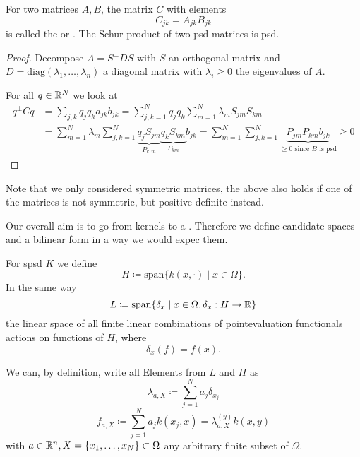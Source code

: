 \begin{lemma}\label{lemma:1.6}
    For two matrices $A,B$, the matrix $C$ with elements 
    \[C_{jk}=A_{jk}B_{jk}\]
    is called the  or . The Schur product of two 
    psd matrices is psd.
\end{lemma}

\begin{proof}
    Decompose $A=S^\perp DS$ with $S$ an 
    orthogonal matrix and $D=\text{diag}(\lambda_1,\dots,\lambda_n)$ 
    a diagonal matrix with $\lambda_i\geq 0$ the eigenvalues of $A$.

    For all $q\in\mathbb{R}^N$ we look at 
    \begin{align*}
        q^\perp Cq&=\sum_{j,k}q_jq_ka_{jk}b_{jk}=\sum_{j,k=1}^N q_j q_k\sum_{m=1}^N\lambda_m S_{jm}S_{km}\\
        &=\sum_{m=1}^N \lambda_m \sum_{j,k=1}^N \underbrace{q_j S_{jm}}_{P_{k,m}} \underbrace{q_k S_{km}}_{P_{km}} b_{jk}=\sum_{m=1}^N\sum_{j,k=1}^N\underbrace{P_{jm}P_{km}b_{jk}}_{\geq 0\text{ since } B \text{ is psd}}\geq 0
    \end{align*}
\end{proof}

\begin{remark}
    Note that we only considered symmetric matrices, the above also holds if one of the matrices is not symmetric, but positive definite instead. %
\end{remark}

\begin{remark}
    Our overall aim is to go from kernels to a . Therefore 
    we define candidate spaces and a bilinear form in a way we would expec them.
\end{remark}

\begin{*definition}
    For spsd $K$ we define 
    \[H\coloneqq\text{span}\{k(x,\cdot)\mid x\in\Omega\}.\]
    In the same way
    \[L\coloneqq \text{span}\{\delta_x\mid x\in\Omega,\delta_x:H\to\mathbb{R}\}\]
    the linear space of all finite linear combinations of pointevaluation functionals actions on functions of $H$, where \[\delta_x(f)=f(x).\]
\end{*definition}

We can, by definition, write all Elements from $L$ and $H$ as 
\[\lambda_{a,X}\coloneqq \sum_{j=1}^Na_j\delta_{x_j}\]
\[f_{a,X}\coloneqq \sum_{j=1}^Na_j k(x_j,x)=\lambda_{a,X}^{(y)}k(x,y)\]
with $a\in\mathbb{R}^n,X=\{x_1,\dots,x_N\}\subset\Omega$ any arbitrary finite subset of $\Omega$.

